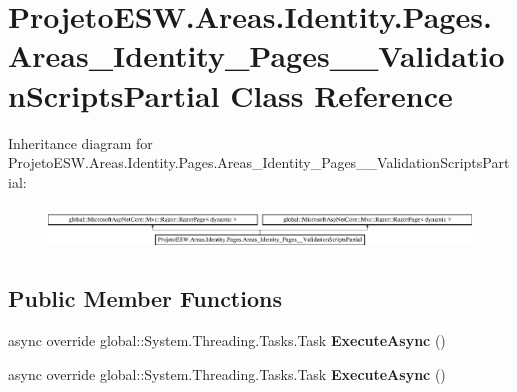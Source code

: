 \hypertarget{class_projeto_e_s_w_1_1_areas_1_1_identity_1_1_pages_1_1_areas___identity___pages_____validation_scripts_partial}{}\section{Projeto\+E\+S\+W.\+Areas.\+Identity.\+Pages.\+Areas\+\_\+\+Identity\+\_\+\+Pages\+\_\+\+\_\+\+Validation\+Scripts\+Partial Class Reference}
\label{class_projeto_e_s_w_1_1_areas_1_1_identity_1_1_pages_1_1_areas___identity___pages_____validation_scripts_partial}
Inheritance diagram for Projeto\+E\+S\+W.\+Areas.\+Identity.\+Pages.\+Areas\+\_\+\+Identity\+\_\+\+Pages\+\_\+\+\_\+\+Validation\+Scripts\+Partial\+:\begin{figure}[H]
\begin{center}
\leavevmode
\includegraphics[height=1.166667cm]{class_projeto_e_s_w_1_1_areas_1_1_identity_1_1_pages_1_1_areas___identity___pages_____validation_scripts_partial}
\end{center}
\end{figure}
\subsection*{Public Member Functions}
\begin{DoxyCompactItemize}
\item 
\mbox{\label{class_projeto_e_s_w_1_1_areas_1_1_identity_1_1_pages_1_1_areas___identity___pages_____validation_scripts_partial_abecea59d00c5de76d167cc51cc4836a5}} 
async override global\+::\+System.\+Threading.\+Tasks.\+Task {\bfseries Execute\+Async} ()
\item 
\mbox{\label{class_projeto_e_s_w_1_1_areas_1_1_identity_1_1_pages_1_1_areas___identity___pages_____validation_scripts_partial_abecea59d00c5de76d167cc51cc4836a5}} 
async override global\+::\+System.\+Threading.\+Tasks.\+Task {\bfseries Execute\+Async} ()
\end{DoxyCompactItemize}

